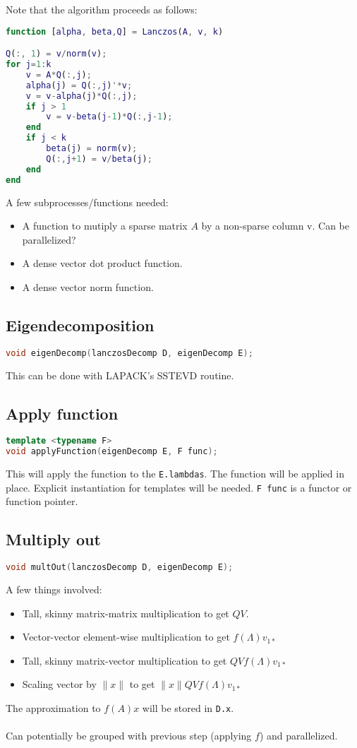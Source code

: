 \documentclass[a4paper, fleqn]{article}
\begin{document}
Note that the algorithm proceeds as follows:

\begin{lstlisting}[language = MATLAB]
function [alpha, beta,Q] = Lanczos(A, v, k)

Q(:, 1) = v/norm(v);
for j=1:k
    v = A*Q(:,j);
    alpha(j) = Q(:,j)'*v;
    v = v-alpha(j)*Q(:,j);
    if j > 1
        v = v-beta(j-1)*Q(:,j-1);
    end
    if j < k 
        beta(j) = norm(v);
        Q(:,j+1) = v/beta(j);
    end
end
\end{lstlisting}

A few subprocesses/functions needed:
\begin{itemize}
        \item A function to mutiply a sparse matrix $A$ by a non-sparse column v. Can be parallelized?
        \item A dense vector dot product function.
        \item A dense vector norm function.
\end{itemize}
\subsection{Eigendecomposition}%
\label{sub:eig}

\begin{lstlisting}[language = C++]
void eigenDecomp(lanczosDecomp D, eigenDecomp E);
\end{lstlisting}
This can be done with LAPACK's SSTEVD routine.

\subsection{Apply function}%
\label{sub:apply_function}
\begin{lstlisting}[language = C++]
template <typename F>
void applyFunction(eigenDecomp E, F func);
\end{lstlisting}
This will apply the function to the \texttt{E.lambdas}. The function will be applied in place. Explicit instantiation for templates will be needed. \texttt{F func} is a functor or function pointer.
\subsection{Multiply out}%
\label{sub:multiply_out}
\begin{lstlisting}[language = C++]
void multOut(lanczosDecomp D, eigenDecomp E);
\end{lstlisting}
A few things involved:
\begin{itemize}
        \item Tall, skinny matrix-matrix multiplication to get $QV$.
        \item Vector-vector element-wise multiplication to get $f(\Lambda)v_{1*}$
\item Tall, skinny matrix-vector multiplication to get $QVf(\Lambda)v_{1*}$
        \item Scaling vector by $\|x\|$ to get $\|x\|QVf(\Lambda)v_{1*}$
\end{itemize}
The approximation to $f(A)x$ will be stored in  \texttt{D.x}. 
\\ \\
Can potentially be grouped with previous step (applying $f$) and parallelized.
\end{document}
